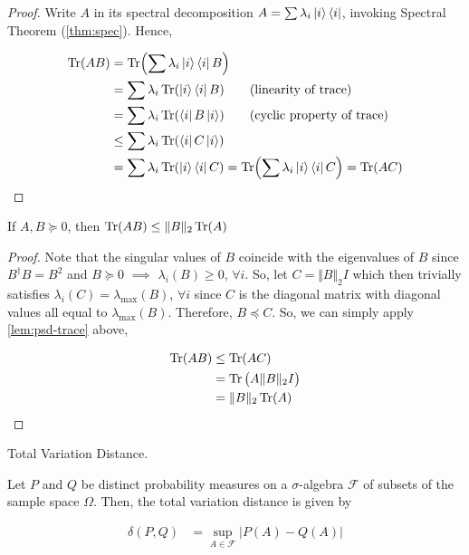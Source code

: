 \documentclass[main.tex]{subfiles}
\begin{document}
{\begin{subappendices}
\begin{lemma}
\begin{proof}
	Write $A$ in its spectral decomposition $A = \sum \lambda_i \ket{i}\bra{i}$, invoking Spectral Theorem (\ref{thm:spec}). Hence,
	
	\begin{align*}
		\Tr(AB) &= \Tr(\sum \lambda_i \ket{i}\bra{i} B)\\
		&= \sum \lambda_i \Tr(\ket{i}\bra{i} B) \tag{linearity of trace}\\
		&= \sum \lambda_i \Tr(\bra{i} B \ket{i}) \tag{cyclic property of trace}\\
		&\leq \sum \lambda_i \Tr(\bra{i} C \ket{i})\\
		&= \sum \lambda_i \Tr(\ket{i}\bra{i} C) = \Tr(\sum \lambda_i \ket{i}\bra{i} C) = \Tr(AC)
	\end{align*}
\end{proof}
\end{lemma}

\begin{corollary}
\label{cor:psd-tr-norm-ineq}
If $A, B \succeq 0$, then $\Tr(AB) \leq \Vert B \Vert_2 \Tr(A)$

\begin{proof}
Note that the singular values of $B$ coincide with the eigenvalues of $B$ since $B^\dag B = B^2$ and $B \succeq 0$ $\implies$ $\lambda_i(B) \geq 0$, $\forall i$. So, let $C = \Vert B \Vert_2 I$ which then trivially satisfies $\lambda_i(C) = \lambda_{\max}(B)$, $\forall i$ since $C$ is the diagonal matrix with diagonal values all equal to $\lambda_{\max}(B)$. Therefore, $B \preceq C$. So, we can simply apply \ref{lem:psd-trace} above,

\begin{align*}
\Tr(AB) &\leq \Tr(AC) \\
&= \Tr\big(A \Vert B \Vert_2 I\big)\\
&= \Vert B \Vert_2 \Tr(A)
\end{align*}
\end{proof}
\end{corollary}

\begin{definition} Total Variation Distance.
\label{def:tve}

Let $P$ and $Q$ be distinct probability measures on a $\sigma$-algebra $\mathcal{F}$ of subsets of the sample space $\Omega$. Then, the total variation distance is given by

\begin{align*}
\delta(P, Q) &= \sup_{A \in \mathcal{F}}\vert P(A) - Q(A)\vert
\end{align*}
\end{definition}


\end{subappendices}}
\end{document}
